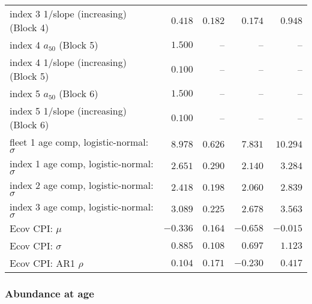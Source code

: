 \documentclass[
]{article}
\begin{document}
\begin{landscape}
\begin{longtable}[t]{lrrrr}
index 3 1/slope (increasing) (Block 4) & $0.418$ & $0.182$ & $0.174$ & $0.948$\\
index 4 $a_{50}$ (Block 5) & $1.500$ & -- & -- & --\\
index 4 1/slope (increasing) (Block 5) & $0.100$ & -- & -- & --\\
index 5 $a_{50}$ (Block 6) & $1.500$ & -- & -- & --\\
\addlinespace
index 5 1/slope (increasing) (Block 6) & $0.100$ & -- & -- & --\\
fleet 1 age comp, logistic-normal: $\sigma$ & $8.978$ & $0.626$ & $7.831$ & $10.294$\\
index 1 age comp, logistic-normal: $\sigma$ & $2.651$ & $0.290$ & $2.140$ & $3.284$\\
index 2 age comp, logistic-normal: $\sigma$ & $2.418$ & $0.198$ & $2.060$ & $2.839$\\
index 3 age comp, logistic-normal: $\sigma$ & $3.089$ & $0.225$ & $2.678$ & $3.563$\\
\addlinespace
Ecov CPI: $\mu$ & $-0.336$ & $0.164$ & $-0.658$ & $-0.015$\\
Ecov CPI: $\sigma$ & $0.885$ & $0.108$ & $0.697$ & $1.123$\\
Ecov CPI: AR1 $\rho$ & $0.104$ & $0.171$ & $-0.230$ & $0.417$\\*
\end{longtable}
\end{landscape}

\subsubsection{Abundance at age}\label{abundance-at-age}
\end{document}
